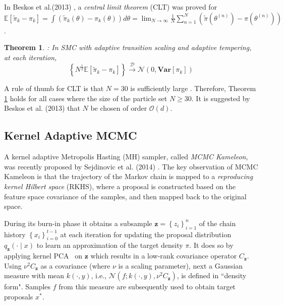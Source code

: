 \documentclass{article} %
\newtheorem{theorem}{Theorem}
\begin{document}
In Beskos et al.(2013) \cite{convergence_ASMC}, a \emph{central limit theorem} (CLT) was proved for $\mathbb{E}[\tilde{\pi}_k-\pi_k]=\int (\tilde{\pi}_k(\theta)-\pi_k(\theta)) d\theta=\lim_{N\rightarrow \infty} \frac{1}{N} \sum_{n=1}^N (\tilde{\pi}(\theta^{(n)})-\pi(\theta^{(n)}) )$. 
\begin{theorem} \cite{convergence_ASMC}: In SMC with adaptive transition scaling and adaptive tempering, at each iteration, 
\begin{equation}
	\left\{N^{\frac{1}{2}} \mathbb{E}[\tilde{\pi}_k-\pi_k]\right\} \xrightarrow{\mathcal{D}} \mathcal{N}(0,\mathbf{Var}[\pi_k])
\end{equation}
\label{theorem:CLT}
\end{theorem}
A rule of thumb for CLT is that $N= 30$ is sufficiently large \cite{intro_prob}. Therefore, Theorem \ref{theorem:CLT} holds 
for all cases where the size of the particle set $N\geq30$. It is suggested by Beskos et al. (2013) \cite{convergence_ASMC} that  $N$ be chosen of order 
$\mathcal{O}(d)$. 


\subsection{Kernel Adaptive MCMC}
A kernel adaptive Metropolis Hasting (MH) sampler, called \emph{MCMC Kameleon},  was recently proposed by  
Sejdinovic et al. (2014) \cite{MCMC_Kameleon}. 
The key observation of MCMC Kameleon is that the trajectory of the Markov chain is mapped to a \emph{reproducing kernel Hilbert space} (RKHS), where      
a proposal is constructed based on the feature space covariance of the samples, and then mapped back to the original space.  

During its burn-in phase it obtains a subsample $\mathbf{z} = \left\{ z_{i} 
\right\}_{i=1}^{n}$ of the chain history $\left\{ x_{i} \right\}_{i=0}^{t-1}$ at each 
iteration for updating the proposal distribution $q_{\mathbf{z}}(\cdot \mid x)$ to 
learn an approximation of the target density $\pi$. It does so by applying kernel 
PCA~\cite{scholkopf1997} on $\mathbf{z}$ which results in a low-rank covariance 
operator $C_{\mathbf{z}}$. Using $\nu^{2}C_{\mathbf{z}}$ as a covariance (where 
$\nu$ is a scaling parameter), next a Gaussian measure with mean $k(\cdot,y)$, 
i.e., $\mathcal{N}(f; k(\cdot,y), \nu^{2}C_{\mathbf{z}})$, is defined in 
``density form". Samples $f$ from this measure are subsequently used 
to obtain target proposals $x^{*}$. 
\end{document}

